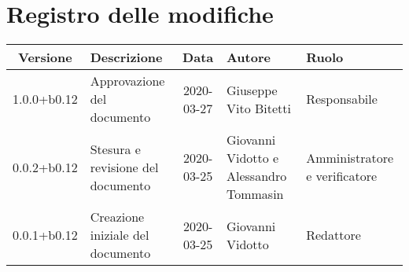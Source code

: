 \section*{Registro delle modifiche}

\begin{center}
	\begin{longtable}{|c|p{3.5cm}|c|p{3cm}|p{3cm}|}
	\hline
	\rowcolor{lighter-grayer}
	\textbf{Versione} & \textbf{Descrizione} & \textbf{Data} & \textbf{Autore} & \textbf{Ruolo} \\
	\hline
	\endfirsthead

	1.0.0+b0.12 & Approvazione del documento & 2020-03-27 & Giuseppe Vito Bitetti & Responsabile \\
	\hline
	0.0.2+b0.12 & Stesura e revisione del documento & 2020-03-25 & Giovanni Vidotto e Alessandro Tommasin & Amministratore e verificatore \\
	\hline
	0.0.1+b0.12 & Creazione iniziale del documento & 2020-03-25 & Giovanni Vidotto & Redattore \\
	\hline

	\end{longtable}
\end{center}
